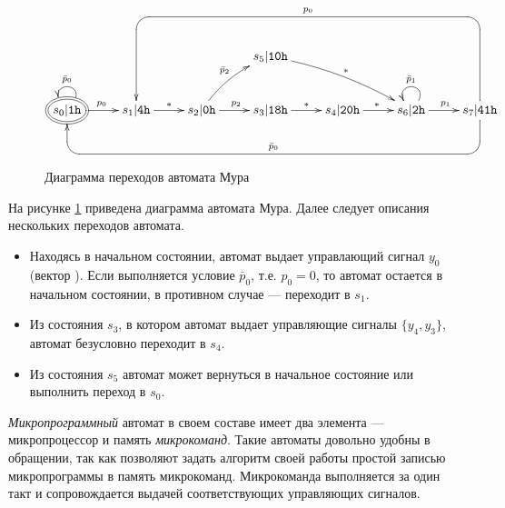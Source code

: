 \begin{figure}[!ht]
    \[
        {\xymatrix{
            *{} &*{}&*{}&*{}&*{}&*{}&*{}    \\
            *{}
                &*{}
                    &*{}
                        &s_5|\Machine{10h}    \ar@{->}@/^/[rrd]^{*} 
                            &*{}
                                &*{}
                                    &*{}
                                        \\
            *++[o][F=]{s_0|\Machine{1h}}  \ar@{->}[r]^{p_0}  \ar@{->}@(ur,ul)[]_{\bar{p}_0}
                &s_1|\Machine{4h}  \ar@{->}[r]^{*}
                    &s_2|\Machine{0h}  \ar@{->}[r]^{p_2}  \ar@{->}@/^/[ru]^{\bar{p}_2}
                        &s_3|\Machine{18h}  \ar@{->}[r]^{*}
                            &s_4|\Machine{20h}  \ar@{->}[r]^{*}
                                &s_6|\Machine{2h}  \ar@{->}[r]^{p_1} \ar@{->}@(ur,ul)[]_{\bar{p}_1}
                                    &s_7|\Machine{41h} \ar`d[dl]`_u[llllll]_{\bar{p}_0}[llllll]
                                                       \ar`u[uul]`[lllll]_{p_0}[lllll]
                                            \\
            *{} &*{}&*{}&*{}&*{}&*{}&*{}    \\
        }}
    \]
    \caption{Диаграмма переходов автомата Мура}
    \label{fig::ch::practice::MooreDiagram}
\end{figure}

На рисунке \ref{fig::ch::practice::MooreDiagram} приведена диаграмма автомата Мура. Далее следует описания нескольких переходов автомата.
\begin{itemize}
    \item Находясь в начальном состоянии, автомат выдает управлающий сигнал $y_0$ (вектор ). Если выполняется условие $\bar{p}_0$, т.е. $p_0=0$, то автомат остается в начальном состоянии, в противном случае --- переходит в $s_1$.
    
    \item Из состояния $s_3$, в котором автомат выдает управляющие сигналы $\{y_4,y_3\}$, автомат безусловно переходит в $s_4$.
    
    \item Из состояния $s_5$ автомат может вернуться в начальное состояние или выполнить переход в $s_0$.
\end{itemize}

\emph{Микропрограммный} автомат в своем составе имеет два элемента --- микропроцессор и память \emph{микрокоманд}. Такие автоматы довольно удобны в обращении, так как позволяют задать алгоритм своей работы простой записью микропрограммы в память микрокоманд. Микрокоманда выполняется за один такт и сопровождается выдачей соответствующих управляющих сигналов.


